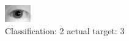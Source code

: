 \begin{figure}[h!]
\begin{center}
\includegraphics[width=0.60\columnwidth]{figures/ID1185_class_2_target_3.png}
\end{center}
\caption{ Classification: 2 actual target: 3}
\label{fig:ID1185_class_2_target_3}
\end{figure}
